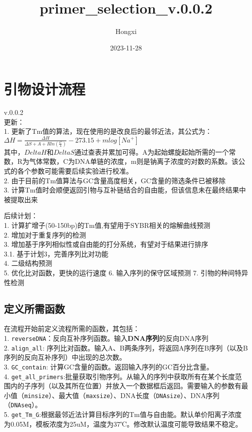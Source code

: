 \documentclass[
]{article}
\title{primer\_selection\_v.0.0.2}
\author{Hongxi}
\date{2023-11-28}
\begin{document}
\maketitle

\hypertarget{ux5f15ux7269ux8bbeux8ba1ux6d41ux7a0b}{%
\section{引物设计流程}\label{ux5f15ux7269ux8bbeux8ba1ux6d41ux7a0b}}

v.0.0.2\\
更新：\\
1. 更新了Tm值的算法，现在使用的是改良后的最邻近法，其公式为：\\

\(\Delta H = \frac{\Delta H}{\Delta S+A+Rln(\frac{C}{4})}-273.15+mlog[Na^+]\)\\
其中，\(Delta H\)和\(Delta S\)通过查表并累加可得。A为起始螺旋起始所需的一个常数，R为气体常数，C为DNA单链的浓度，m则是钠离子浓度的对数的系数。该公式的各个参数可能需要后续实验进行校准。\\
2. 由于目前的Tm值算法与GC含量高度相关，GC含量的筛选条件已被移除\\
3.
计算Tm值时会顺便返回引物与互补链结合的自由能，但该信息未在最终结果中被提取出来

后续计划：\\
1. 计算扩增子(50-150bp)的Tm值,有望用于SYBR相关的熔解曲线预测\\
2. 增加对于重复序列的检测\\
3. 增加基于序列相似性或自由能的打分系统，有望对于结果进行排序\\
3.1. 基于计划3，完善序列比对功能\\
4. 二级结构预测\\
5. 优化比对函数，更快的运行速度 6. 输入序列的保守区域预测 7.
引物的种间特异性检测

\hypertarget{ux5b9aux4e49ux6240ux9700ux51fdux6570}{%
\subsection{定义所需函数}\label{ux5b9aux4e49ux6240ux9700ux51fdux6570}}

在流程开始前定义流程所需的函数，其包括：\\
1.
\texttt{reverseDNA}：反向互补序列函数。输入\textbf{DNA序列}的反向DNA序列\\
2. \texttt{align\_all}:
序列比对函数。输入A、B两条序列，将返回A序列在B序列（以及B序列的反向互补序列）中出现的总次数。\\
3. \texttt{GC\_contain}:
计算GC含量的函数。返回输入序列的GC百分比含量。\\
4.
\texttt{get\_all\_primers}:批量获取引物序列。从输入的序列中获取所有在某个长度范围内的子序列（以及其所在位置）并放入一个数据框后返回。需要输入的参数有最小值（\texttt{minsize}）、最大值（\texttt{maxsize}）、DNA长度（\texttt{DNAsize}）、DNA序列（\texttt{DNAseq}）。\\
5.
\texttt{get\_Tm\_G}:根据最邻近法计算目标序列的Tm值与自由能。默认单价阳离子浓度为0.05M，模板浓度为25uM，温度为37℃。修改默认温度可能导致结果不稳定。
\end{document}
